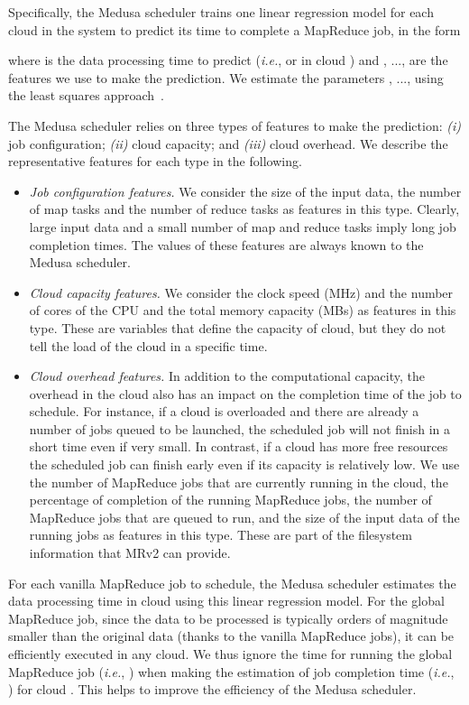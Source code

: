 \documentclass[10pt, conference, compsocconf]{IEEEtran}
\begin{document}
Specifically, the Medusa scheduler trains one linear regression model for each cloud in the system to predict its time to complete a MapReduce job, in the form

where  is the data processing time to predict (\textit{i.e.},  or  in cloud ) and , ...,  are the  features we use to make the prediction.
We estimate the parameters , ...,  using the least squares approach~\cite{bjoerck_least_squares96}.

The Medusa scheduler relies on three types of features to make the prediction: \textit{(i)} job configuration; \textit{(ii)} cloud capacity; and \textit{(iii)} cloud overhead. We describe the representative features for each type in the following.
\begin{itemize}
    \item \textit{Job configuration features.} We consider the size of the input data, the number of map tasks and the number of reduce tasks as features in this type. Clearly, large input data and a small number of map and reduce tasks imply long job completion times. The values of these features are always known to the Medusa scheduler.
    \item \textit{Cloud capacity features.} We consider the clock speed (MHz) and the number of cores of the CPU and the total memory capacity (MBs) as features in this type.
    These are variables that define the capacity of cloud, but they do not tell the load of the cloud in a specific time.
    \item \textit{Cloud overhead features.} In addition to the computational capacity, the overhead in the cloud also has an impact on the completion time of the job to schedule. For instance, if a cloud is overloaded and there are already a number of jobs queued to be launched, the scheduled job will not finish in a short time even if very small. In contrast, if a cloud has more free resources the scheduled job can finish early even if its capacity is relatively low. We use the number of MapReduce jobs that are currently running in the cloud, the percentage of completion of the running MapReduce jobs, the number of MapReduce jobs that are queued to run, and the size of the input data of the running jobs as features in this type. These are part of the filesystem information that MRv2 can provide.
\end{itemize}

For each vanilla MapReduce job to schedule, the Medusa scheduler estimates the data processing time  in cloud  using this linear regression model.
For the global MapReduce job, since the data to be processed is typically orders of magnitude smaller than the original data (thanks to the vanilla MapReduce jobs), it can be efficiently executed in any cloud.
We thus ignore the time for running the global MapReduce job (\textit{i.e.}, ) when making the estimation of job completion time (\textit{i.e.}, ) for cloud . This helps to improve the efficiency of the Medusa scheduler.
\end{document}
